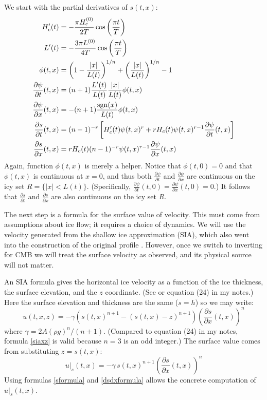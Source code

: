 \documentclass[letterpaper,final,12pt,reqno]{amsart}
\newcommand{\sgn}{\operatorname{sgn}}
\begin{document}
We start with the partial derivatives of $s(t,x)$:
\begin{align}
H_c'(t) &= - \frac{\pi H_c^{(0)}}{2T} \cos\left(\frac{\pi t}{T}\right) \notag\\
L'(t) &= - \frac{3 \pi L^{(0)}}{4T} \cos\left(\frac{\pi t}{T}\right) \notag \\
\phi(t,x) &= \left(1 - \frac{|x|}{L(t)}\right)^{1/n} + \left(\frac{|x|}{L(t)}\right)^{1/n} - 1 \notag \\
\frac{\partial \psi}{\partial t}(t,x) &= (n+1) \frac{L'(t)}{L(t)} \frac{|x|}{L(t)} \phi(t,x) \notag \\
\frac{\partial \psi}{\partial x}(t,x) &= - (n+1) \frac{\sgn(x)}{L(t)} \phi(t,x) \notag \\
\frac{\partial s}{\partial t}(t,x) &= (n-1)^{-r} \left[H_c'(t) \psi(t,x)^r + r H_c(t) \psi(t,x)^{r-1} \frac{\partial \psi}{\partial t}(t,x)\right] \label{dsdtformula} \\
\frac{\partial s}{\partial x}(t,x) &= r H_c(t) (n-1)^{-r} \psi(t,x)^{r-1} \frac{\partial \psi}{\partial x}(t,x) \label{dsdxformula}
\end{align}
Again, function $\phi(t,x)$ is merely a helper.  Notice that $\phi(t,0)=0$ and that $\phi(t,x)$ is continuous at $x=0$, and thus both $\frac{\partial \psi}{\partial t}$ and $\frac{\partial \psi}{\partial x}$ are continuous on the icy set $R = \{|x|<L(t)\}$.  (Specifically, $\frac{\partial \psi}{\partial t}(t,0)=\frac{\partial \psi}{\partial x}(t,0)=0$.)  It follows that $\frac{\partial s}{\partial t}$ and $\frac{\partial s}{\partial x}$ are also continuous on the icy set $R$.

The next step is a formula for the surface value of velocity.  This must come from assumptions about ice flow; it requires a choice of dynamics.  We will use the velocity generated from the shallow ice approximation (SIA), which also went into the construction of the original profile \cite[section 5.3]{vanderVeen2013}.  However, once we switch to inverting for CMB we will treat the surface velocity as observed, and its physical source will not matter.

An SIA formula gives the horizontal ice velocity as a function of the ice thickness, the surface elevation, and the $z$ coordinate.  (See \cite{GreveBlatter2009,vanderVeen2013} or equation (24) in my notes.)  Here the surface elevation and thickness are the same ($s=h$) so we may write:
\begin{equation}
u(t,x,z) = - \gamma \left(s(t,x)^{n+1} - (s(t,x)-z)^{n+1}\right) \left(\frac{\partial s}{\partial x}(t,x)\right)^n \label{siaxz}
\end{equation}
where $\gamma = 2 A (\rho g)^n / (n+1)$.  (Compared to equation (24) in my notes, formula \eqref{siaxz} is valid because $n=3$ is an odd integer.)  The surface value comes from substituting $z=s(t,x)$:
\begin{equation}
u|_s(t,x) = - \gamma\, s(t,x)^{n+1} \left(\frac{\partial s}{\partial x}(t,x)\right)^n \label{siasurfacex}
\end{equation}
Using formulas \eqref{sformula} and \eqref{dsdxformula} allows the concrete computation of $u|_s(t,x)$.
\end{document}
